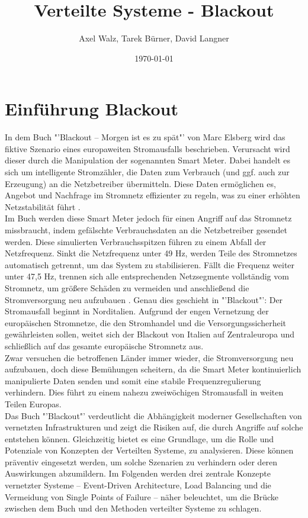 \documentclass[a4paper,12pt]{article}
\title{Verteilte Systeme - Blackout}
\author{Axel Walz, Tarek Bürner, David Langner}
\date{\today}
\let\stdsection\section
\renewcommand\section{\newpage\stdsection}
\begin{document}
\onehalfspacing 

\maketitle

\newpage 
\tableofcontents
\newpage 
\pagestyle{plain}

\section{Einführung Blackout}
In dem Buch "'Blackout – Morgen ist es zu spät"' von Marc Elsberg wird das fiktive Szenario eines europaweiten Stromausfalls beschrieben. Verursacht wird dieser durch die Manipulation der sogenannten Smart Meter. Dabei handelt es sich um intelligente Stromzähler, die Daten zum Verbrauch (und ggf. auch zur Erzeugung) an die Netzbetreiber übermitteln. Diese Daten ermöglichen es, Angebot und Nachfrage im Stromnetz effizienter zu regeln, was zu einer erhöhten Netzstabilität führt \cite{SmartMeter}. \\
Im Buch werden diese Smart Meter jedoch für einen Angriff auf das Stromnetz missbraucht, indem gefälschte Verbrauchsdaten an die Netzbetreiber gesendet werden. Diese simulierten Verbrauchsspitzen führen zu einem Abfall der Netzfrequenz. Sinkt die Netzfrequenz unter 49 Hz, werden Teile des Stromnetzes automatisch getrennt, um das System zu stabilisieren. Fällt die Frequenz weiter unter 47,5 Hz, trennen sich alle entsprechenden Netzsegmente vollständig vom Stromnetz, um größere Schäden zu vermeiden und anschließend die Stromversorgung neu aufzubauen \cite{Netzfrequenz}. Genau dies geschieht in "'Blackout"': Der Stromausfall beginnt in Norditalien. Aufgrund der engen Vernetzung der europäischen Stromnetze, die den Stromhandel und die Versorgungssicherheit gewährleisten sollen, weitet sich der Blackout von Italien auf Zentraleuropa und schließlich auf das gesamte europäische Stromnetz aus.\\
Zwar versuchen die betroffenen Länder immer wieder, die Stromversorgung neu aufzubauen, doch diese Bemühungen scheitern, da die Smart Meter kontinuierlich manipulierte Daten senden und somit eine stabile Frequenzregulierung verhindern. Dies führt zu einem nahezu zweiwöchigen Stromausfall in weiten Teilen Europas.\\
Das Buch "'Blackout"' verdeutlicht die Abhängigkeit moderner Gesellschaften von vernetzten Infrastrukturen und zeigt die Risiken auf, die durch Angriffe auf solche entstehen können. Gleichzeitig bietet es eine Grundlage, um die Rolle und Potenziale von Konzepten der Verteilten Systeme, zu analysieren. Diese können präventiv eingesetzt werden, um solche Szenarien zu verhindern oder deren Auswirkungen abzumildern. Im Folgenden werden drei zentrale Konzepte vernetzter Systeme – Event-Driven Architecture, Load Balancing und die Vermeidung von Single Points of Failure – näher beleuchtet, um die Brücke zwischen dem Buch und den Methoden verteilter Systeme zu schlagen.
\end{document}
